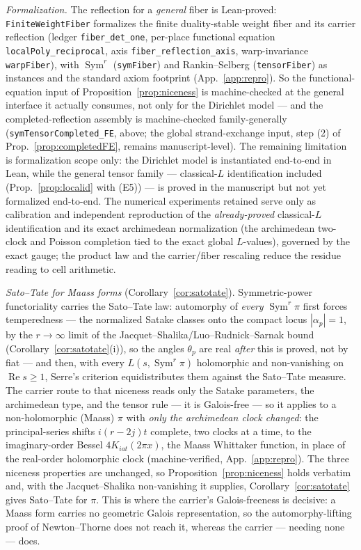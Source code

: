 \documentclass[11pt]{article}
\theoremstyle{definition}
\renewcommand{\Re}{\operatorname{Re}}
\newcommand{\Sym}{\operatorname{Sym}}
\begin{document}
\emph{Formalization.} The reflection for a \emph{general} fiber is Lean-proved: \texttt{FiniteWeightFiber}
formalizes the finite duality-stable weight fiber and its
carrier reflection (ledger \texttt{fiber\_det\_one}, per-place functional equation
\texttt{localPoly\_reciprocal}, axis \texttt{fiber\_reflection\_axis}, warp-invariance
\texttt{warpFiber}), with $\Sym^r$ (\texttt{symFiber}) and Rankin--Selberg (\texttt{tensorFiber}) as
instances and the standard axiom footprint (App.~\ref{app:repro}).  So the functional-equation input of
Proposition~\ref{prop:niceness} is machine-checked at the general interface it actually consumes, not
only for the Dirichlet model --- and the completed-reflection assembly is machine-checked family-generally
(\texttt{symTensorCompleted\_FE}, above; the global strand-exchange input, step (2) of
Prop.~\ref{prop:completedFE}, remains manuscript-level).  The remaining limitation is formalization scope only: the
Dirichlet model is instantiated end-to-end in Lean, while the general tensor family --- classical-$L$
identification included (Prop.~\ref{prop:localid} with \textup{(E5)}) --- is proved in the manuscript but not yet
formalized end-to-end.  The numerical experiments retained serve only as calibration and independent reproduction
of the \emph{already-proved} classical-$L$ identification and its exact archimedean normalization (the archimedean
two-clock and Poisson completion tied to the exact global $L$-values), governed by the exact gauge; the product law
and the carrier/fiber rescaling reduce the residue reading to cell arithmetic.

\emph{Sato--Tate for Maass forms} (Corollary~\ref{cor:satotate}). Symmetric-power functoriality carries
the Sato--Tate law: automorphy of \emph{every} $\Sym^r\pi$ first forces temperedness --- the normalized
Satake classes onto the compact locus $|\alpha_p|=1$, by the $r\to\infty$ limit of the
Jacquet--Shalika/Luo--Rudnick--Sarnak bound \cite{JS,LRS} (Corollary~\ref{cor:satotate}(i)), so the angles $\theta_p$ are
real \emph{after} this is proved, not by fiat --- and then, with every $L(s,\Sym^r\pi)$ holomorphic and
non-vanishing on $\Re s\ge1$, Serre's criterion \cite{Serre} equidistributes them against the Sato--Tate
measure. The carrier
route to that niceness reads only the Satake parameters, the archimedean type, and the tensor rule --- it
is Galois-free --- so it applies to a non-holomorphic (Maass) $\pi$ with \emph{only the archimedean clock
changed}: the principal-series shifts $i(r-2j)t$ complete, two clocks at a time, to the imaginary-order
Bessel $4K_{iat}(2\pi x)$, the Maass Whittaker function, in place of the real-order holomorphic clock
(machine-verified, App.~\ref{app:repro}). The three niceness properties are unchanged, so
Proposition~\ref{prop:niceness} holds verbatim and, with the Jacquet--Shalika \cite{JS} non-vanishing it
supplies, Corollary~\ref{cor:satotate} gives Sato--Tate for $\pi$. This is where the carrier's
Galois-freeness is decisive: a Maass form carries no geometric Galois representation, so the
automorphy-lifting proof of Newton--Thorne \cite{NT} does not reach it, whereas the carrier --- needing
none --- does.
\end{document}
